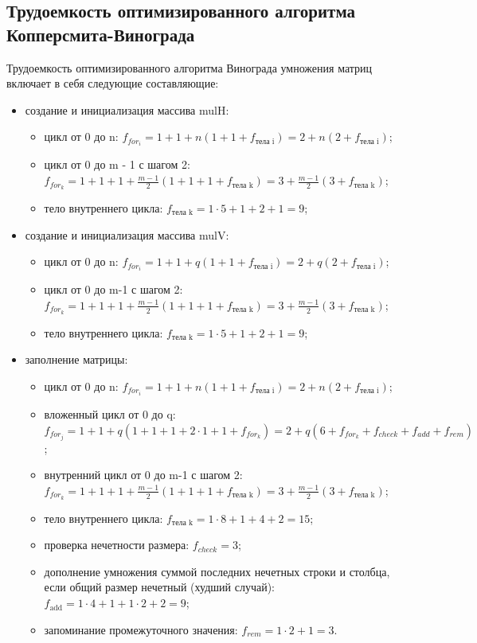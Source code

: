 \documentclass[12pt]{report}
\begin{document}
    \subsection{Трудоемкость оптимизированного алгоритма Копперсмита-Винограда}
    Трудоемкость оптимизированного алгоритма Винограда умножения матриц
    включает в себя следующие составляющие:
    \begin{itemize}
        \item создание и инициализация массива mulH:
        \begin{itemize}
            \item цикл от 0 до n: $f_{for_i}=1 + 1 + n(1 + 1 + f_{\text{тела i}}) = 2 + n(2 + f_{\text{тела i}})$;
            \item цикл от 0 до m - 1 с шагом 2: $f_{for_k}=1 + 1 + 1 + \frac{m-1}{2}(1 + 1 + 1 + f_{\text{тела k}}) = 3 + \frac{m-1}{2}(3 + f_{\text{тела k}})$;
            \item тело внутреннего цикла: $f_{\text{тела k}} = 1 \cdot 5 + 1 + 2 + 1 = 9$;
        \end{itemize}
        \item создание и инициализация массива mulV:
        \begin{itemize}
            \item цикл от 0 до n: $f_{for_i}=1 + 1 + q(1 + 1 + f_{\text{тела i}}) = 2 + q(2 + f_{\text{тела i}})$;
            \item цикл от 0 до m-1 с шагом 2: $f_{for_k}=1 + 1 + 1 + \frac{m-1}{2}(1 + 1 + 1 + f_{\text{тела k}}) = 3 + \frac{m-1}{2}(3 + f_{\text{тела k}})$;
            \item тело внутреннего цикла: $f_{\text{тела k}} = 1 \cdot 5 + 1 + 2 + 1 = 9$;
        \end{itemize}
        \item заполнение матрицы:
        \begin{itemize}
            \item цикл от 0 до n: $f_{for_i}=1 + 1 + n(1 + 1 + f_{\text{тела i}}) = 2 + n(2 + f_{\text{тела i}})$;
            \item вложенный цикл от 0 до q: $f_{for_j}=1 + 1 +q(1 + 1 + 1 + 2\cdot1 + 1 + f_{for_k}) = 2 + q(6 + f_{for_k} + f_{check} + f_{add} + f_{rem})$;
            \item внутренний цикл от 0 до m-1 с шагом 2: $f_{for_k}=1 + 1 + 1 + \frac{m-1}{2}(1 + 1 + 1 + f_{\text{тела k}}) = 3 + \frac{m-1}{2}(3 + f_{\text{тела k}})$;
            \item тело внутреннего цикла: $f_{\text{тела k}} = 1 \cdot 8 + 1 + 4 + 2 = 15$;
            \item проверка нечетности размера: $f_{check} = 3$;
            \item дополнение умножения суммой последних нечетных строки и столбца, если общий размер нечетный (худший случай): $f_{\text{add}} = 1 \cdot 4 + 1 + 1\cdot2 + 2 = 9$;
            \item запоминание промежуточного значения: $f_{rem} = 1\cdot2+1 = 3$.
        \end{itemize}
    \end{itemize}
\end{document}
